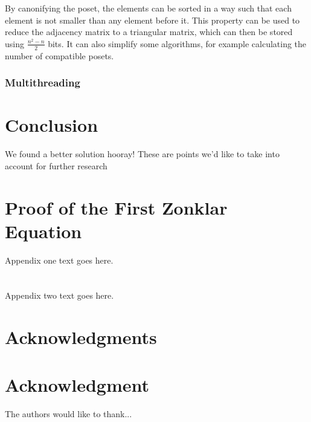 \documentclass[10pt,journal,compsoc]{IEEEtran}
\begin{document}
By canonifying the poset, the elements can be sorted in a way such that each element is not smaller than any element before it.
This property can be used to reduce the adjacency matrix to a triangular matrix, which can then be stored using $\frac{n^2 - n}{2}$ bits.
It can also simplify some algorithms, for example calculating the number of compatible posets.

\subsubsection{Multithreading}

\section{Conclusion}
We found a better solution hooray!
These are points we'd like to take into account for further research


\appendices
\section{Proof of the First Zonklar Equation}
Appendix one text goes here.
\section{}
Appendix two text goes here.


\ifCLASSOPTIONcompsoc
  \section*{Acknowledgments}
\else
  \section*{Acknowledgment}
\fi


The authors would like to thank...

\ifCLASSOPTIONcaptionsoff
  \newpage
\fi




\end{document}
